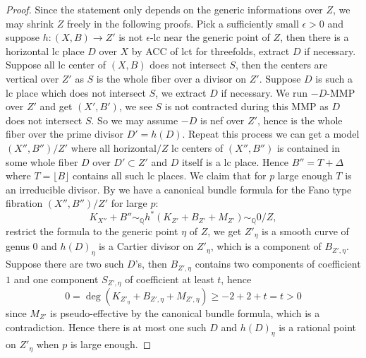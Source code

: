 \documentclass[letterpaper,reqno,12pt]{amsart}
\numberwithin{equation}{section}
\theoremstyle{plain}
\begin{document}
\begin{proof}
    Since the statement only depends on the generic informations over $Z$, we may shrink $Z$ freely in the following proofs. Pick a sufficiently small $\epsilon>0$ and suppose $h:(X,B)\to Z'$ is not $\epsilon$-lc near the generic point of $Z$, then there is a horizontal lc place $D$ over $X$ by ACC of lct for threefolds, extract $D$ if necessary. Suppose all lc center of $(X,B)$ does not intersect $S$, then the centers are vertical over $Z'$ as $S$ is the whole fiber over a divisor on $Z'$. Suppose $D$ is such a lc place which does not intersect $S$, we extract $D$ if necessary. We run $-D$-MMP over $Z'$ and get $(X',B')$, we see $S$ is not contracted during this MMP as $D$ does not intersect $S$. So we may assume $-D$ is nef over $Z'$, hence is the whole fiber over the prime divisor $D'=h(D)$. Repeat this process we can get a model $(X'',B'')/Z'$ where all horizontal$/Z$ lc centers of $(X'',B'')$ is contained in some whole fiber $D$ over $D'\subset Z'$ and $D$ itself is a lc place. Hence $B''=T+\Delta$ where $T=\lfloor B\rfloor$ contains all such lc places. We claim that for $p$ large enough $T$ is an irreducible divisor. By \cite[Theorem 3.4]{complement1} we have a canonical bundle formula for the Fano type fibration $(X'',B'')/Z'$ for large $p$:
    \[K_{X''}+B''\sim_\mathbb Q h^*(K_{Z'}+B_{Z'}+M_{Z'})\sim_\mathbb Q0/Z,\] restrict the formula to the generic point $\eta$ of $Z$, we get $Z'_\eta$ is a smooth curve of genus $0$ and $h(D)_\eta$ is a Cartier divisor on $Z'_\eta$, which is a component of $B_{Z',\eta}$. Suppose there are two such $D$'s, then $B_{Z',\eta}$ contains two components of coefficient $1$ and one component $S_{Z',\eta}$ of coefficient at least $t$, hence \[0=\deg (K_{Z'_\eta}+B_{Z',\eta}+M_{Z',\eta})\geq -2+2+t=t>0\] since $M_{Z'}$ is pseudo-effective by the canonical bundle formula, which is a contradiction. Hence there is at most one such $D$ and $h(D)_\eta$ is a rational point on $Z'_\eta$ when $p$ is large enough. 
    

\end{proof}
\end{document}
